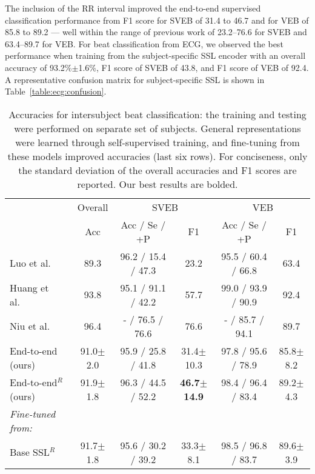 \documentclass{article}
\newcommand{\std}[1]{{\scriptsize{$\pm$#1}}}
\begin{document}
The inclusion of the RR interval improved the end-to-end supervised
classification performance from F1 score for SVEB of 31.4 to 46.7 and for VEB of
85.8 to 89.2 --- well within the range of previous work
\cite{de_chazal_automatic_2004,huang_new_2014,garcia_inter-patient_2017,xu_towards_2019,niu_inter-patient_2019}
of 23.2--76.6 for SVEB and 63.4--89.7 for VEB. For beat classification from ECG,
we observed the best performance when training from the subject-specific SSL
encoder with an overall accuracy of 93.2\%$\pm$1.6\%, F1 score of SVEB of 43.8,
and F1 score of VEB of 92.4. A representative confusion matrix for
subject-specific SSL is shown in Table~\ref{table:ecg:confusion}.



\begin{table}[H]
  \caption{Accuracies for intersubject beat classification: the training and
  testing were performed on separate set of subjects. General representations
  were learned through self-supervised training, and fine-tuning from these
  models improved accuracies (last six rows). For conciseness, only the standard
  deviation of the overall accuracies and F1 scores are reported. Our best
  results are bolded.}
  \label{table:ecg:beat:fine}
  \centering
  \begin{tabular}{lccccc}
    \toprule
    & \multicolumn{1}{c}{Overall}
    & \multicolumn{2}{c}{SVEB}
    & \multicolumn{2}{c}{VEB} \\
    \cmidrule(lr){2-2}\cmidrule(lr){3-4}\cmidrule(lr){5-6}
    & Acc & Acc / Se / +P & F1 & Acc / Se / +P & F1 \\
    \hline
Luo et al.~\cite{luo_patient-specific_2017} & 89.3
    & 96.2 / 15.4 / 47.3 & 23.2 & 95.5 / 60.4 / 66.8 & 63.4 \\
Huang et al.~\cite{huang_new_2014} & 93.8
    & 95.1 / 91.1 / 42.2 & 57.7 & 99.0 / 93.9 / 90.9 & 92.4\\
Niu et al.~\cite{niu_inter-patient_2019} & 96.4
    & - / 76.5 / 76.6 & 76.6 & - / 85.7 / 94.1 & 89.7 \\
\hline
End-to-end (ours)
    & 91.0\std{2.0}
    & 95.9 / 25.8 / 41.8 & 31.4\std{10.3}
    & 97.8 / 95.6 / 78.9 & 85.8\std{8.2}\\

End-to-end$^{R}$ (ours)
    & 91.9\std{1.8}
    & 96.3 / 44.5 / 52.2 & \textbf{46.7\std{14.9}}
    & 98.4 / 96.4 / 83.4 & 89.2\std{4.3} \\

    \hline
    \textit{Fine-tuned from:}\\
\hspace{10pt}Base SSL$^{R}$
    & 91.7\std{1.8}
    & 95.6 / 30.2 / 39.2 & 33.3\std{8.1}
    & 98.5 / 96.8 / 83.7 & 89.6\std{3.9} \\


\end{tabular}
\end{table}
\end{document}
